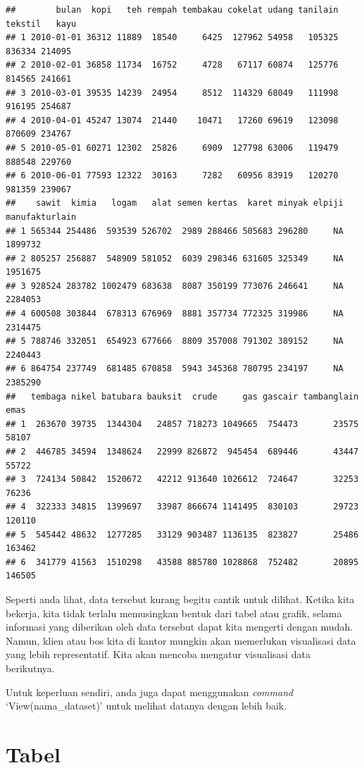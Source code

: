 \documentclass[
]{book}
\begin{document}
\begin{verbatim}
##        bulan  kopi   teh rempah tembakau cokelat udang tanilain tekstil   kayu
## 1 2010-01-01 36312 11889  18540     6425  127962 54958   105325  836334 214095
## 2 2010-02-01 36858 11734  16752     4728   67117 60874   125776  814565 241661
## 3 2010-03-01 39535 14239  24954     8512  114329 68049   111998  916195 254687
## 4 2010-04-01 45247 13074  21440    10471   17260 69619   123098  870609 234767
## 5 2010-05-01 60271 12302  25826     6909  127798 63006   119479  888548 229760
## 6 2010-06-01 77593 12322  30163     7282   60956 83919   120270  981359 239067
##    sawit  kimia   logam   alat semen kertas  karet minyak elpiji manufakturlain
## 1 565344 254486  593539 526702  2989 288466 505683 296280     NA        1899732
## 2 805257 256887  548909 581052  6039 298346 631605 325349     NA        1951675
## 3 928524 283782 1002479 683638  8087 350199 773076 246641     NA        2284053
## 4 600508 303844  678313 676969  8881 357734 772325 319986     NA        2314475
## 5 788746 332051  654923 677666  8809 357008 791302 389152     NA        2240443
## 6 864754 237749  681485 670858  5943 345368 780795 234197     NA        2385290
##   tembaga nikel batubara bauksit  crude     gas gascair tambanglain   emas
## 1  263670 39735  1344304   24857 718273 1049665  754473       23575  58107
## 2  446785 34594  1348624   22999 826872  945454  689446       43447  55722
## 3  724134 50842  1520672   42212 913640 1026612  724647       32253  76236
## 4  322333 34815  1399697   33987 866674 1141495  830103       29723 120110
## 5  545442 48632  1277285   33129 903487 1136135  823827       25486 163462
## 6  341779 41563  1510298   43588 885780 1028868  752482       20895 146505
\end{verbatim}

Seperti anda lihat, data tersebut kurang begitu cantik untuk dilihat. Ketika kita bekerja, kita tidak terlalu memusingkan bentuk dari tabel atau grafik, selama informasi yang diberikan oleh data tersebut dapat kita mengerti dengan mudah. Namun, klien atau bos kita di kantor mungkin akan memerlukan visualisasi data yang lebih representatif. Kita akan mencoba mengatur visualisasi data berikutnya.

Untuk keperluan sendiri, anda juga dapat menggunakan \emph{command} `View(nama\_dataset)' untuk melihat datanya dengan lebih baik.

\hypertarget{tabel}{%
\section{Tabel}\label{tabel}}
\end{document}
